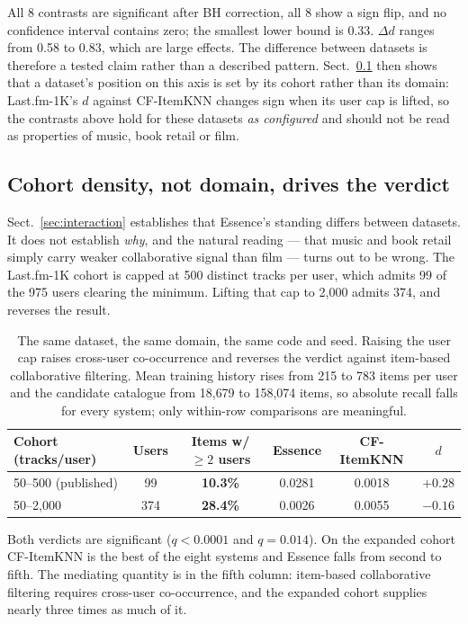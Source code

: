 \documentclass[runningheads]{llncs}
\begin{document}
All 8 contrasts are significant after BH correction, all 8 show a sign flip, and no
confidence interval contains zero; the smallest lower bound is 0.33. $\Delta d$ ranges
from 0.58 to 0.83, which are large effects. The difference between datasets is therefore a
tested claim rather than a described pattern. Sect.~\ref{sec:cohort} then shows that a
dataset's position on this axis is set by its cohort rather than its domain: Last.fm-1K's
$d$ against CF-ItemKNN changes sign when its user cap is lifted, so the contrasts above
hold for these datasets \emph{as configured} and should not be read as properties of
music, book retail or film.

\subsection{Cohort density, not domain, drives the verdict}\label{sec:cohort}

Sect.~\ref{sec:interaction} establishes that Essence's standing differs between datasets.
It does not establish \emph{why}, and the natural reading --- that music and book retail
simply carry weaker collaborative signal than film --- turns out to be wrong. The Last.fm-1K
cohort is capped at 500 distinct tracks per user, which admits 99 of the 975 users clearing
the minimum. Lifting that cap to 2{,}000 admits 374, and reverses the result.

\begin{table}[t]
\caption{The same dataset, the same domain, the same code and seed. Raising the user cap
raises cross-user co-occurrence and reverses the verdict against item-based collaborative
filtering. Mean training history rises from 215 to 783 items per user and the candidate
catalogue from 18{,}679 to 158{,}074 items, so absolute recall falls for every system;
only within-row comparisons are meaningful.}\label{tab:cohort}
\centering
\small
\begin{tabular}{@{}lccccc@{}}
\toprule
Cohort (tracks/user) & Users & Items w/ $\geq 2$ users & Essence & CF-ItemKNN & $d$ \\
\midrule
50--500 (published) & 99 & \textbf{10.3\%} & 0.0281 & 0.0018 & $\mathbf{+0.28}$ \\
50--2{,}000 & 374 & \textbf{28.4\%} & 0.0026 & 0.0055 & $\mathbf{-0.16}$ \\
\bottomrule
\end{tabular}
\end{table}

Both verdicts are significant ($q < 0.0001$ and $q = 0.014$). On the expanded cohort
CF-ItemKNN is the best of the eight systems and Essence falls from second to fifth. The
mediating quantity is in the fifth column: item-based collaborative filtering requires
cross-user co-occurrence, and the expanded cohort supplies nearly three times as much of it.
\end{document}
